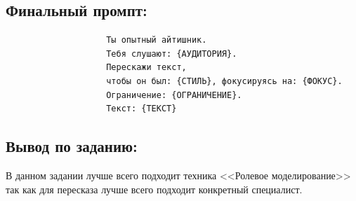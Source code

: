 \subsection{Финальный промпт:}
\begin{verbatim}
					Ты опытный айтишник.
					Тебя слушают: {АУДИТОРИЯ}.
					Перескажи текст,
					чтобы он был: {СТИЛЬ}, фокусируясь на: {ФОКУС}.
					Ограничение: {ОГРАНИЧЕНИЕ}.
					Текст: {ТЕКСТ}
\end{verbatim}
\subsection{Вывод по заданию:}
\indent В данном задании лучше всего подходит техника <<Ролевое  моделирование>> так как для пересказа лучше всего подходит конкретный специалист.
	